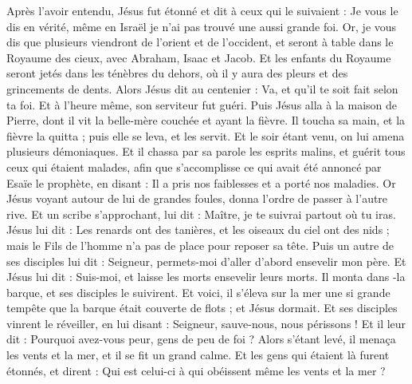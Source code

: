 \begin{multicols}{2}
Après l’avoir entendu, Jésus fut étonné et dit à ceux qui le suivaient : Je vous le dis en vérité, même en Israël je n'ai pas trouvé une aussi grande foi.
Or, je vous dis que plusieurs viendront de l’orient et de l’occident, et seront à table dans le Royaume des cieux, avec Abraham, Isaac et Jacob.
Et les enfants du Royaume seront jetés dans les ténèbres du dehors, où il y aura des pleurs et des grincements de dents.
Alors Jésus dit au centenier : Va, et qu'il te soit fait selon ta foi. Et à l'heure même, son serviteur fut guéri.
Puis Jésus alla à la maison de Pierre, dont il vit la belle-mère couchée et ayant la fièvre.
Il toucha sa main, et la fièvre la quitta ; puis elle se leva, et les servit.
Et le soir étant venu, on lui amena plusieurs démoniaques. Et il chassa par sa parole les esprits malins, et guérit tous ceux qui étaient malades,
afin que s’accomplisse ce qui avait été annoncé par Esaïe le prophète, en disant : Il a pris nos faiblesses et a porté nos maladies{}.
Or Jésus voyant autour de lui de grandes foules, donna l’ordre de passer à l'autre rive.
Et un scribe s'approchant, lui dit : Maître, je te suivrai partout où tu iras.
Jésus lui dit : Les renards ont des tanières, et les oiseaux du ciel ont des nids ; mais le Fils de l'homme n'a pas de place pour reposer sa tête.
Puis un autre de ses disciples lui dit : Seigneur, permets-moi d'aller d’abord ensevelir mon père.
Et Jésus lui dit : Suis-moi, et laisse les morts ensevelir leurs morts.
Il monta dans -la barque, et ses disciples le suivirent.
Et voici, il s'éleva sur la mer une si grande tempête que la barque était couverte de flots ; et Jésus dormait.
Et ses disciples vinrent le réveiller, en lui disant : Seigneur, sauve-nous, nous périssons !
Et il leur dit : Pourquoi avez-vous peur, gens de peu de foi ? Alors s'étant levé, il menaça les vents et la mer, et il se fit un grand calme.
Et les gens qui étaient là furent étonnés, et dirent : Qui est celui-ci à qui obéissent même les vents et la mer ?

\end{multicols}
